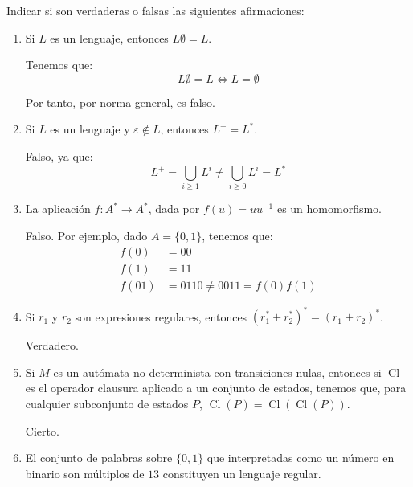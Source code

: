 \documentclass[12pt]{article}
\begin{document}
    \begin{ejercicio}[2.5 puntos]
        Indicar si son verdaderas o falsas las siguientes afirmaciones:
        \begin{enumerate}
            \item Si $L$ es un lenguaje, entonces $L\emptyset = L$.
            
            Tenemos que:
            \begin{equation*}
                L\emptyset = L\Longleftrightarrow L=\emptyset
            \end{equation*}

            Por tanto, por norma general, es falso.
            \item Si $L$ es un lenguaje y $\varepsilon \notin L$, entonces $L^+ = L^*$.
            
            Falso, ya que:
            \begin{equation*}
                L^+=\bigcup_{i\geq 1}L^i\neq \bigcup_{i\geq 0}L^i = L^*
            \end{equation*}
            
            \item La aplicación $f : A^* \to A^*$, dada por $f(u) = uu^{-1}$ es un homomorfismo.
            
            Falso. Por ejemplo, dado $A=\{0,1\}$, tenemos que:
            \begin{align*}
                f(0)&= 00\\
                f(1)&= 11\\
                f(01)&= 0110\neq 0011 = f(0)f(1)
            \end{align*}

            \item Si $r_1$ y $r_2$ son expresiones regulares, entonces $(r_1^* + r_2^*)^* = (r_1 + r_2)^*$.
            
            Verdadero.
            \item Si $M$ es un autómata no determinista con transiciones nulas, entonces si $\operatorname{Cl}$ es el operador clausura aplicado a un conjunto de estados, tenemos que, para cualquier subconjunto de estados $P$, $\operatorname{Cl}(P) = \operatorname{Cl}(\operatorname{Cl}(P))$.
            

            Cierto.
            \item El conjunto de palabras sobre $\{0, 1\}$ que interpretadas como un número en binario son múltiplos de $13$ constituyen un lenguaje regular.
            

\end{enumerate}
\end{ejercicio}
\end{document}
